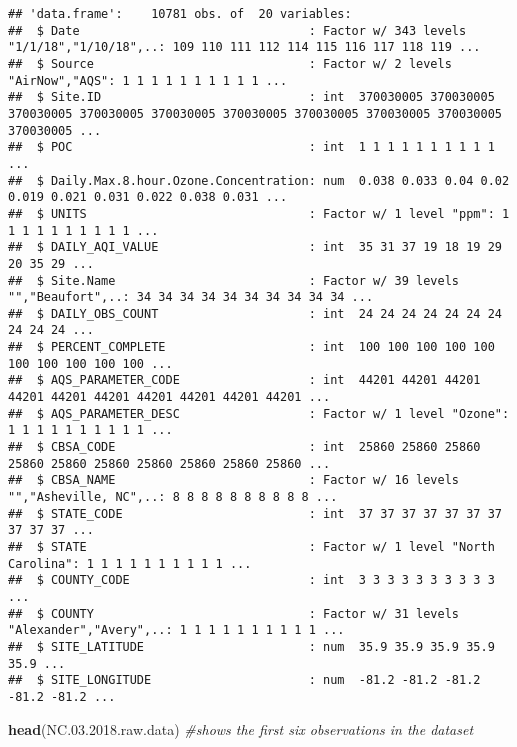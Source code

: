 \documentclass[]{article}
\newenvironment{Shaded}{\begin{snugshade}}{\end{snugshade}}
\newcommand{\KeywordTok}[1]{\textcolor[rgb]{0.13,0.29,0.53}{\textbf{#1}}}
\newcommand{\FloatTok}[1]{\textcolor[rgb]{0.00,0.00,0.81}{#1}}
\newcommand{\CommentTok}[1]{\textcolor[rgb]{0.56,0.35,0.01}{\textit{#1}}}
\newcommand{\NormalTok}[1]{#1}
\begin{document}
\begin{verbatim}
## 'data.frame':    10781 obs. of  20 variables:
##  $ Date                                : Factor w/ 343 levels "1/1/18","1/10/18",..: 109 110 111 112 114 115 116 117 118 119 ...
##  $ Source                              : Factor w/ 2 levels "AirNow","AQS": 1 1 1 1 1 1 1 1 1 1 ...
##  $ Site.ID                             : int  370030005 370030005 370030005 370030005 370030005 370030005 370030005 370030005 370030005 370030005 ...
##  $ POC                                 : int  1 1 1 1 1 1 1 1 1 1 ...
##  $ Daily.Max.8.hour.Ozone.Concentration: num  0.038 0.033 0.04 0.02 0.019 0.021 0.031 0.022 0.038 0.031 ...
##  $ UNITS                               : Factor w/ 1 level "ppm": 1 1 1 1 1 1 1 1 1 1 ...
##  $ DAILY_AQI_VALUE                     : int  35 31 37 19 18 19 29 20 35 29 ...
##  $ Site.Name                           : Factor w/ 39 levels "","Beaufort",..: 34 34 34 34 34 34 34 34 34 34 ...
##  $ DAILY_OBS_COUNT                     : int  24 24 24 24 24 24 24 24 24 24 ...
##  $ PERCENT_COMPLETE                    : int  100 100 100 100 100 100 100 100 100 100 ...
##  $ AQS_PARAMETER_CODE                  : int  44201 44201 44201 44201 44201 44201 44201 44201 44201 44201 ...
##  $ AQS_PARAMETER_DESC                  : Factor w/ 1 level "Ozone": 1 1 1 1 1 1 1 1 1 1 ...
##  $ CBSA_CODE                           : int  25860 25860 25860 25860 25860 25860 25860 25860 25860 25860 ...
##  $ CBSA_NAME                           : Factor w/ 16 levels "","Asheville, NC",..: 8 8 8 8 8 8 8 8 8 8 ...
##  $ STATE_CODE                          : int  37 37 37 37 37 37 37 37 37 37 ...
##  $ STATE                               : Factor w/ 1 level "North Carolina": 1 1 1 1 1 1 1 1 1 1 ...
##  $ COUNTY_CODE                         : int  3 3 3 3 3 3 3 3 3 3 ...
##  $ COUNTY                              : Factor w/ 31 levels "Alexander","Avery",..: 1 1 1 1 1 1 1 1 1 1 ...
##  $ SITE_LATITUDE                       : num  35.9 35.9 35.9 35.9 35.9 ...
##  $ SITE_LONGITUDE                      : num  -81.2 -81.2 -81.2 -81.2 -81.2 ...
\end{verbatim}

\begin{Shaded}
\begin{Highlighting}[]
\KeywordTok{head}\NormalTok{(NC.}\FloatTok{03.2018}\NormalTok{.raw.data) }\CommentTok{#shows the first six observations in the dataset}
\end{Highlighting}
\end{Shaded}
\end{document}
